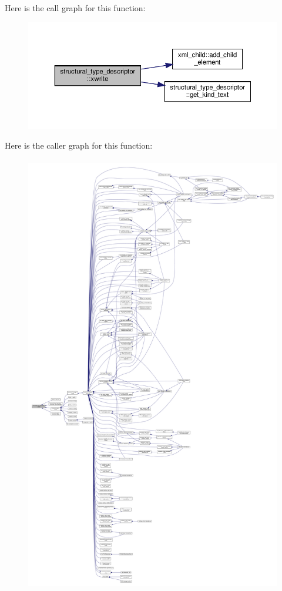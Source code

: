 Here is the call graph for this function\+:
\nopagebreak
\begin{figure}[H]
\begin{center}
\leavevmode
\includegraphics[width=350pt]{dc/da4/structstructural__type__descriptor_ad0fc728cbbedbabdd23bb2e9e749b89c_cgraph}
\end{center}
\end{figure}
Here is the caller graph for this function\+:
\nopagebreak
\begin{figure}[H]
\begin{center}
\leavevmode
\includegraphics[height=550pt]{dc/da4/structstructural__type__descriptor_ad0fc728cbbedbabdd23bb2e9e749b89c_icgraph}
\end{center}
\end{figure}


